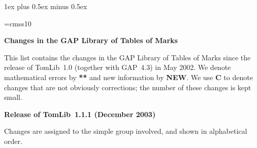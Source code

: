 
\parskip 1ex plus 0.5ex minus 0.5ex
\parindent0pt

\font\sf=cmss10
\def\CAS{{\sf CAS}}
\def\GAP{{\sf GAP}}
\def\MOC{{\sf MOC}}

\def\contrib#1{}

\def\tthdump#1{#1}

\tthdump{\centerline{\bf Changes in the {\GAP} Library of Tables of Marks}}

\bigbreak


This list contains the changes in the {\GAP} Library of Tables of Marks
since the release of TomLib~1.0 (together with {\GAP}~4.3) in May 2002.
We denote mathematical errors by {\bf ***} and new information
by {\bf NEW}\null.
We use {\bf C} to denote changes that are not obviously corrections;
the number of these changes is kept small.

\bigbreak

{\bf Release of TomLib~1.1.1 (December 2003)}

\bigbreak

Changes are assigned to the simple group involved,
and shown in alphabetical order.

\medbreak

